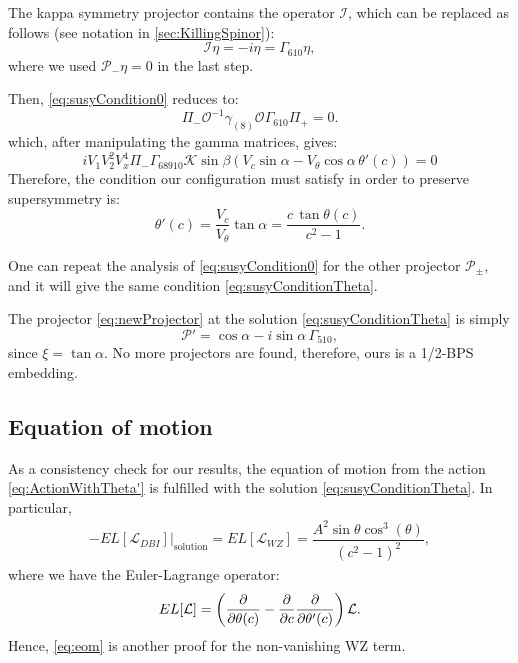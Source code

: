 The kappa symmetry projector contains the operator $\mathcal{I}$, which can be replaced as follows (see notation in \ref{sec:KillingSpinor}):
\begin{equation}
 \mathcal{I}\eta =-i \eta = \Gamma_{610} \eta,
\end{equation}
where we used $\mathcal{P}_- \eta =0$ in the last step. 

Then, \eqref{eq:susyCondition0} reduces to:
\begin{equation}
 \Pi_{-} \mathcal{O}^{-1} \gamma_{(8)} \mathcal{O} \Gamma_{610} \Pi_{+}  = 0.
\end{equation}
which, after manipulating the gamma matrices, gives:
\begin{equation}
i V_1 V_2^2 V_x^4 \Pi_- \Gamma_{6 8 9 10} \mathcal{K} \sin\beta \left(V_c \sin\alpha - V_\theta \cos\alpha \, \theta'(c)\right) = 0
\end{equation}
Therefore, the condition our configuration must satisfy in order to preserve supersymmetry is:
\begin{equation}\label{eq:susyConditionTheta}
 \theta'(c) = \dfrac{V_c}{V_\theta} \tan\alpha = \dfrac{c \, \tan\theta(c)}{c^2-1} .
\end{equation}


One can repeat the analysis of \eqref{eq:susyCondition0} for the other projector $\mathcal{P}_{\pm}$, and it will give the same condition \eqref{eq:susyConditionTheta}.


The projector \eqref{eq:newProjector} at the solution \eqref{eq:susyConditionTheta} is simply
\begin{equation}
\mathcal{P}' = \cos \alpha - i \sin \alpha \, \Gamma_{510},
\end{equation}
since $ \xi =  \tan \alpha $.
No more projectors are found, therefore, ours is a 1/2-BPS embedding.


\subsection{Equation of motion}

As a consistency check for our results, the equation of motion from the action \eqref{eq:ActionWithTheta'} is fulfilled with the solution \eqref{eq:susyConditionTheta}. In particular, 
\begin{align}\label{eq:eom}
-\left.EL[\mathcal{L}_{DBI}]\right|_\text{solution} = EL[\mathcal{L}_{WZ}] = \dfrac{A^2 \sin\theta \cos^3(\theta)}{\left(c^2-1\right)^2},
\end{align}
where we have the Euler-Lagrange operator:
\begin{equation}
 EL[\mathcal{L}] = 
 \left(\dfrac{\partial }{\partial \theta(c)} -\dfrac{\partial }{\partial c}  \dfrac{\partial }{\partial \theta'(c)} \right) \mathcal{L}.
\end{equation}
Hence, \eqref{eq:eom} is another proof for the non-vanishing WZ term.




